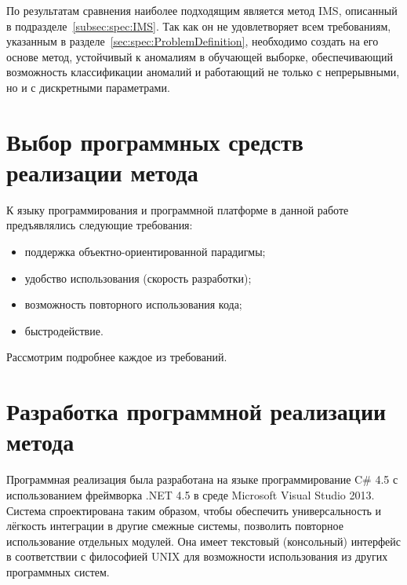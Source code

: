 По результатам сравнения наиболее подходящим является метод IMS, описанный в подразделе~\ref{subsec:spec:IMS}. Так как он не удовлетворяет всем требованиям, указанным в разделе~\ref{sec:spec:ProblemDefinition}, необходимо создать на его основе метод, устойчивый к аномалиям в обучающей выборке, обеспечивающий возможность классификации аномалий и работающий не только с непрерывными, но и с дискретными параметрами.



\section{Выбор программных средств реализации метода}

К языку программирования и программной платформе в данной работе предъявлялись следующие требования:
\begin{itemize}
	\item поддержка объектно-ориентированной парадигмы;
	\item удобство использования (скорость разработки);
	\item возможность повторного использования кода;
	\item быстродействие.
\end{itemize}

Рассмотрим подробнее каждое из требований.







\section{Разработка программной реализации метода}
Программная реализация была разработана на языке программирование C\# 4.5 с использованием фреймворка .NET 4.5 в среде Microsoft Visual Studio 2013. Система спроектирована таким образом, чтобы обеспечить универсальность и лёгкость интеграции в другие смежные системы, позволить повторное использование отдельных модулей. Она имеет текстовый (консольный) интерфейс в соответствии с философией UNIX для возможности использования из других программных систем.

